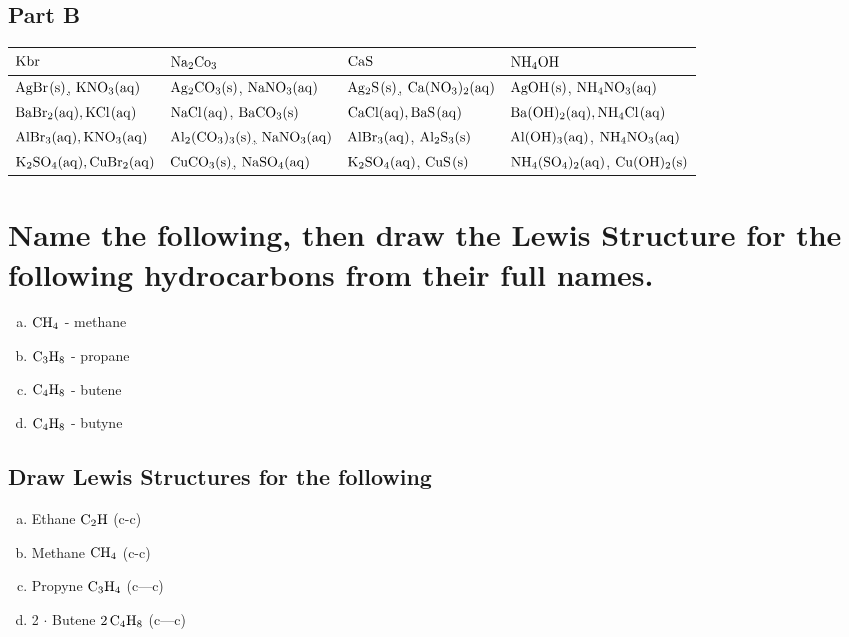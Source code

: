 \documentclass{scrartcl}
\begin{document}
\subsection{Part B}
\label{sec:orga859db9}
\begin{center}
\begin{tabular}{llll}
\toprule
\(\ce{Kbr}\) & \(\ce{Na2Co3}\) & \(\ce{CaS}\) & \(\ce{NH4OH}\)\\
\midrule
\uline{\(\ce{AgBr(s)}\),} \(\ce{KNO3(aq)}\) & \uline{\(\ce{Ag2CO3(s)}\)}, \(\ce{NaNO3(aq)}\) & \uline{\(\ce{Ag2S(s)}\),}  \(\ce{Ca(NO3)2(aq)}\) & \uline{\(\ce{AgOH(s)}\)}, \(\ce{NH4NO3(aq)}\)\\
\midrule
\(\ce{BaBr2(aq), KCl(aq)}\) & \(\ce{NaCl(aq)}\), \uline{\(\ce{BaCO3(s)}\)} & \(\ce{CaCl(aq), BaS(aq)}\) & \(\ce{Ba(OH)2(aq), NH4Cl(aq)}\)\\
\midrule
\(\ce{AlBr3(aq), KNO3(aq)}\) & \uline{\(\ce{Al2(CO3)3(s)}\),} \(\ce{NaNO3(aq)}\) & \(\ce{AlBr3(aq)}\), \uline{\(\ce{Al2S3(s)}\)} & \uline{\(\ce{Al(OH)3(aq)}\),} \(\ce{NH4NO3(aq)}\)\\
\midrule
\(\ce{K2SO4(aq), CuBr2(aq)}\) & \uline{\(\ce{CuCO3(s)}\),} \(\ce{NaSO4(aq)}\) & \(\ce{K2SO4(aq)}\), \uline{\(\ce{CuS(s)}\)} & \(\ce{NH4(SO4)2(aq)}\), \uline{\(\ce{Cu(OH)2(s)}\)}\\
\bottomrule
\end{tabular}
\end{center}

\section{Name the following, then draw the Lewis Structure for the following hydrocarbons from their full names.}
\label{sec:orgdeffed8}
\begin{enumerate}[a.]
\item \(\ce{CH4}\) - methane
\item \(\ce{C3H8}\) - propane
\item \(\ce{C4H8}\) - butene
\item \(\ce{C4H8}\) - butyne
\end{enumerate}

\subsection{Draw Lewis Structures for the following}
\label{sec:org6392f6a}
\begin{enumerate}[a.]
\item Ethane \(\ce{C2H}\) (c-c)
\item Methane \(\ce{CH4}\) (c-c)
\item Propyne \(\ce{C3H4}\) (c---c)
\item 2 \(\cdot\) Butene \(\ce{2C4H8}\) (c---c)
\end{enumerate}
\end{document}
